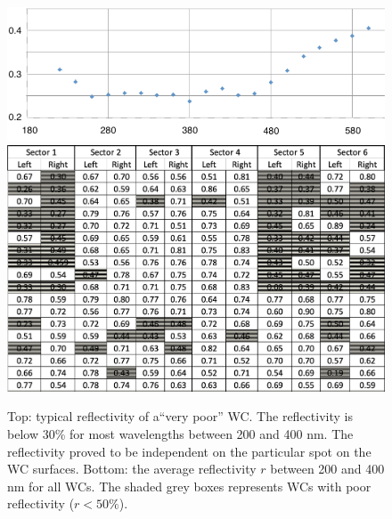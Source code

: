 \begin{figure}
	\centering
	\includegraphics[width=0.98\columnwidth,keepaspectratio]{img/winstoConeSample2Reflectivity.png}
	\includegraphics[width=0.98\columnwidth,keepaspectratio]{img/wcStatusBefore.png}
	\caption{Top: typical reflectivity of a``very poor'' WC. The reflectivity is below 30\% for most wavelengths between 200 and 400 nm.
             The reflectivity proved to be independent on the particular spot on the WC surfaces.
             Bottom: the average reflectivity $r$ between 200 and 400 nm for all WCs. The shaded grey boxes represents WCs with poor reflectivity ($r < 50\%$).}
	\label{fig:wcStatusBefore}
\end{figure}


